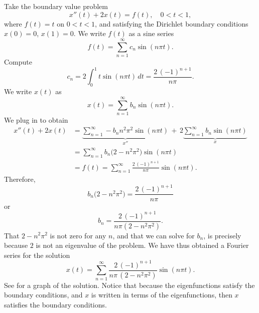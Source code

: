 \begin{example}
Take the boundary value problem
\begin{equation*}
x''(t) + 2 x(t) = f(t) ,
\quad
0 < t < 1,
\end{equation*}
where $f(t) = t$ on $0 < t < 1$, and 
satisfying the Dirichlet boundary conditions
$x(0) = 0$, $x(1)=0$.
We write $f(t)$ as a sine series
\begin{equation*}
f(t) = \sum_{n=1}^\infty c_n \sin (n \pi t) .
\end{equation*}
Compute
\begin{equation*}
c_n = 2 \int_0^1 t \sin (n \pi t) \,dt = \frac{2 \, {(-1)}^{n+1}}{n \pi} .
\end{equation*}
We write $x(t)$ as
\begin{equation*}
x(t) = \sum_{n=1}^\infty b_n \sin (n \pi t) .
\end{equation*}
We plug in to obtain 
\begin{equation*}
\begin{split}
x''(t) + 2 x(t) & =
\underbrace{
\sum_{n=1}^\infty - b_n n^2 \pi^2 \sin (n \pi t)
}_{x''}
\,
+
\,
2
\underbrace{
\sum_{n=1}^\infty b_n \sin (n \pi t)
}_{x}
\\
& =
\sum_{n=1}^\infty b_n \bigl(2 - n^2 \pi^2 \bigr) \sin (n \pi t)
\\
& = f(t)
=
\sum_{n=1}^\infty  \frac{2\, {(-1)}^{n+1}}{n \pi} \sin (n \pi t) .
\end{split}
\end{equation*}
Therefore,
\begin{equation*}
b_n \bigl(2 - n^2 \pi^2\bigr)
=
\frac{2\,{(-1)}^{n+1}}{n \pi}
\end{equation*}
or
\begin{equation*}
b_n
=
\frac{2\,{(-1)}^{n+1}}{n \pi (2 - n^2 \pi^2)} .
\end{equation*}
That $2-n^2\pi^2$ is not zero for any $n$, and that we can
solve for $b_n$, is precisely because
$2$ is not an eigenvalue of the problem.
We have thus obtained a Fourier series for the solution
\begin{equation*}
x(t) = 
\sum_{n=1}^\infty
\frac{2\,{(-1)}^{n+1}}{n \pi \,(2 - n^2 \pi^2)}
\sin (n \pi t) .
\end{equation*}
See  for a graph of the solution.
Notice that because the eigenfunctions satisfy the boundary conditions, 
and $x$ is written in terms of the eigenfunctions, then $x$
satisfies the boundary conditions.
\begin{myfig}
\capstart
{}
\caption{Plot of the solution of $x''+2x=t$, $x(0)=0$, $x(1)=0$.%
\label{bnd-dirich-graph:fig}}
\end{myfig}
\end{example}

